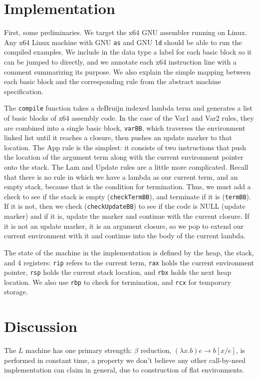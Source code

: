 \documentclass[preprint]{sigplanconf}
\begin{document}
\section{Implementation}\label{sec:impl}

First, some preliminaries. We target the x64 GNU assembler running on
Linux. Any x64 Linux machine with GNU \texttt{as} and GNU \texttt{ld} should
be able to run the compiled examples.  We include in the data type a label for
each basic block so it can be jumped to directly, and we annotate each x64
instruction line with a comment summarizing its purpose.  We also explain the
simple mapping between each basic block and the corresponding rule from the
abstract machine specification.

The \texttt{compile} function takes a deBruijn indexed lambda term and
generates a list of basic blocks of x64 assembly code. In the case of the Var1
and Var2 rules, they are combined into a single basic block, \texttt{varBB},
which traverses the environment linked list until it reaches a closure, then
pushes an update marker to that location. The App rule is the simplest: it
consists of two instructions that push the location of the argument term along
with the current environment pointer onto the stack. The Lam and Update rules
are a little more complicated.  Recall that there is no rule in which we have a
lambda as our current term, and an empty stack, because that is the condition
for termination. Thus, we must add a check to see if the stack is empty
(\texttt{checkTermBB}), and terminate if it is (\texttt{termBB}). If it is not,
then we check (\texttt{checkUpdateBB}) to see if the code is NULL (update
marker) and if it is, update the marker and continue with the current closure.
If it is not an update marker, it is an argument closure, so we pop to extend
our current environment with it and continue into the body of the current
lambda.

The state of the machine in the implementation is defined by the heap, the
stack, and 4 registers: \texttt{rip} refers to the current term, \texttt{rax}
holds the current environment pointer, \texttt{rsp} holds the current stack
location, and \texttt{rbx} holds the next heap location. We also use
\texttt{rbp} to check for termination, and \texttt{rcx} for temporary storage.



\section{Discussion}
The $L$ machine has one primary strength: $\beta$ reduction, $(\lambda x.b) e
\rightarrow b[x/e]$, is performed in constant time, a property we don't believe
any other call-by-need implementation can claim in general, due to construction
of flat environments.
\end{document}
